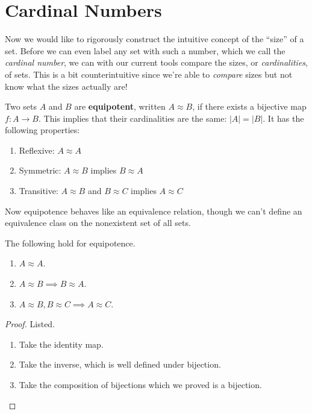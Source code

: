 \section{Cardinal Numbers} 

  Now we would like to rigorously construct the intuitive concept of the ``size'' of a set. Before we can even label any set with such a number, which we call the \textit{cardinal number}, we can with our current tools compare the sizes, or \textit{cardinalities}, of sets. This is a bit counterintuitive since we're able to \textit{compare} sizes but not know what the sizes actually are! 

  \begin{definition}[Equipotence]
    Two sets $A$ and $B$ are \textbf{equipotent}, written $A \approx B$, if there exists a bijective map $f: A \rightarrow B$. This implies that their cardinalities are the same: $|A| = |B|$. It has the following properties: 
    \begin{enumerate}
      \item Reflexive: $A \approx A$
      \item Symmetric: $A \approx B$ implies $B \approx A$
      \item Transitive: $A \approx B$ and $B \approx C$ implies $A \approx C$
    \end{enumerate}
  \end{definition} 

  Now equipotence behaves like an equivalence relation, though we can't define an equivalence class on the nonexistent set of all sets. 

  \begin{theorem}
    The following hold for equipotence. 
    \begin{enumerate}
      \item $A \approx A$. 
      \item $A \approx B \implies B \approx A$. 
      \item $A \approx B, B \approx C \implies A \approx C$. 
    \end{enumerate}
  \end{theorem}
  \begin{proof}
    Listed. 
    \begin{enumerate}
      \item Take the identity map. 
      \item Take the inverse, which is well defined under bijection. 
      \item Take the composition of bijections which we proved is a bijection. 
    \end{enumerate}
  \end{proof}

